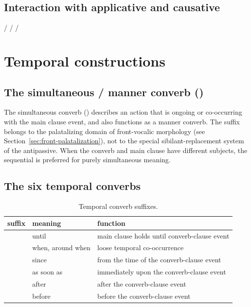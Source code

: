 \subsection{Interaction with applicative and causative}

\pex
\a {} /  
\a {} /  
\a {} /  
\xe

\section{Temporal constructions}\label{sec:temporal}

\subsection{The simultaneous / manner converb ()}

The simultaneous converb () describes an action that is ongoing or co-occurring with the main clause event, and also functions as a manner converb. The suffix belongs to the palatalizing domain of front-vocalic morphology (see Section~\ref{sec:front-palatalization}), not to the special sibilant-replacement system of the antipassive. When the converb and main clause have different subjects, the sequential  is preferred for purely simultaneous meaning.

\subsection{The six temporal converbs}

\begin{table}[ht]
	\footnotesize\sffamily
	\caption{Temporal converb suffixes.}\label{tab:tempconverbs}
	\medskip
	\begin{tabularx}{0.9\textwidth}{L l L}
		\toprule
		{\sc suffix} & {\sc meaning} & {\sc function} \\
		\midrule
		    & until              & main clause holds until converb-clause event \\
		  & when, around when  & loose temporal co-occurrence \\
		    & since              & from the time of the converb-clause event \\
		 & as soon as         & immediately upon the converb-clause event \\
		  & after              & after the converb-clause event \\
		    & before             & before the converb-clause event \\
		\bottomrule
	\end{tabularx}
\end{table}

